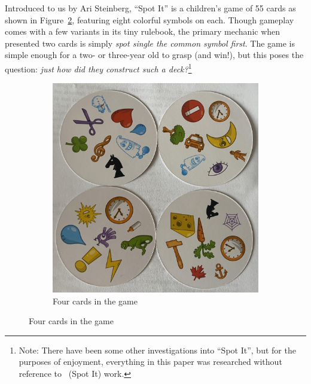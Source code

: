 \documentclass[11pt, oneside]{article} 	%
\begin{document}
Introduced to us by Ari Steinberg, ``Spot It'' is a children's game of 55 cards as shown in Figure~\ref{fig:cards}, featuring eight colorful symbols on each. Though gameplay comes with a few variants in its tiny rulebook, the primary mechanic when presented two cards is simply \emph{spot single the common symbol first}. The game is simple enough for a two- or three-year old to grasp (and win!), but this poses the question: \emph{just how did they construct such a deck?}\footnote{Note: There have been some other investigations into ``Spot It''\cite{2}, but for the purposes of enjoyment, everything in this paper was researched without reference to \ (Spot It) work.}

\begin{figure}[!htb]
\centering
\begin{subfigure}{.2\textwidth}
\includegraphics[scale=.2]{cards}
\caption{Four cards in the game}
\label{fig:cards}
\end{subfigure}


\end{figure}
\end{document}
